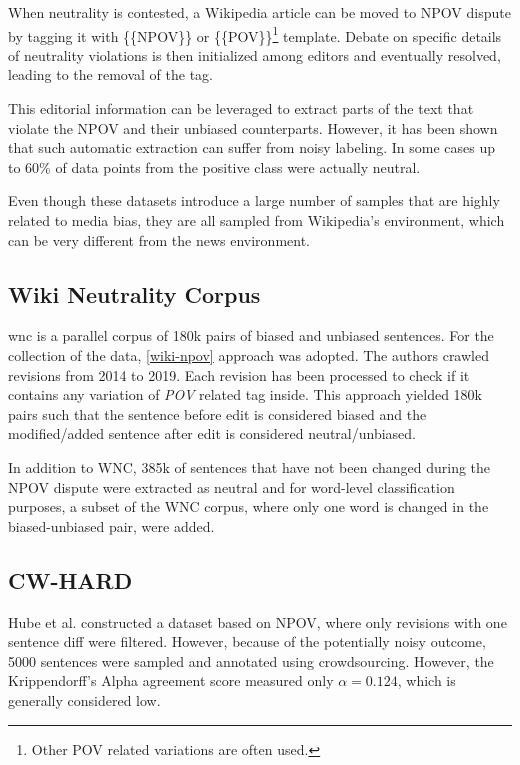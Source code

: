 When neutrality is contested, a Wikipedia article can be moved to NPOV dispute by tagging it with \{\{NPOV\}\} or \{\{POV\}\}\footnote{Other POV related variations are often used.} template. Debate on specific details of neutrality violations is then initialized among editors and eventually resolved, leading to the removal of the tag.

This editorial information can be leveraged to extract parts of the text that violate the NPOV and their unbiased counterparts. However, it has been shown \cite{hube2019neural,zhong-etal-2021-wikibias-detecting} that such automatic extraction can suffer from noisy labeling. In some cases \cite{hube2019neural} up to 60\% of data points from the positive class were actually neutral.

Even though these datasets introduce a large number of samples that are highly related to media bias, they are all sampled from Wikipedia's environment, which can be very different from the news environment.



\subsection{Wiki Neutrality Corpus}\label{wiki}
\Gls{wnc} \cite{pryzant2020automatically} is a parallel corpus of 180k pairs of biased and unbiased sentences. For the collection of the data, \ref{wiki-npov} approach was adopted. The authors crawled revisions from 2014 to 2019. Each revision has been processed to check if it contains any variation of \textit{POV} related tag inside. This approach yielded 180k pairs such that the sentence before edit is considered biased and the modified/added sentence after edit is considered neutral/unbiased.
    
In addition to WNC, 385k of sentences that have not been changed during the NPOV dispute were extracted as neutral and for word-level classification purposes, a subset of the WNC corpus, where only one word is changed in the biased-unbiased pair, were added.




\subsection{CW-HARD}
Hube et al. \cite{hube2019neural} constructed a dataset based on NPOV, where only revisions with one sentence diff were filtered. However, because of the potentially noisy outcome, 5000 sentences were sampled and annotated using crowdsourcing. However, the Krippendorff's Alpha agreement score measured only $\alpha = 0.124$, which is generally considered low. 

